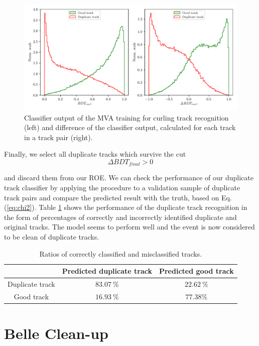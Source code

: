 \begin{figure}[H]
	\centering
	\captionsetup{width=0.8\linewidth}
	\includegraphics[width=\linewidth]{fig/ROECleanup_curl}
	\caption{Classifier output of the MVA training for curling track recognition (left) and difference of the classifier output, calculated for each track in a track pair (right).}
	\label{fig:ROE_curl}
\end{figure}

Finally, we select all duplicate tracks which survive the cut 
\begin{equation}
\Delta BDT_{final} > 0
\end{equation}

and discard them from our ROE. We can check the performance of our duplicate track classifier by applying the procedure to a validation sample of duplicate track pairs and compare the predicted result with the truth, based on Eq. (\ref{eq:chi2}). Table \ref{tab:rat} shows the performance of the duplicate track recognition in the form of percentages of correctly and incorrectly identified duplicate and original tracks. The model seems to perform well and the event is now considered to be clean of duplicate tracks.

\begin{table}[H]
	\centering
	\begin{tabular}{c|c|c}
		& Predicted duplicate track & Predicted good track \\
		\toprule
		Duplicate track & $83.07~\%$  & $22.62~\%$  \\
		Good track & $16.93~\%$ & $77.38\%$ \\
		\bottomrule
	\end{tabular}
	\captionsetup{width=.8\linewidth}
	\caption{Ratios of correctly classified and misclassified tracks.}
	\label{tab:rat}
\end{table}

\section{Belle Clean-up}

